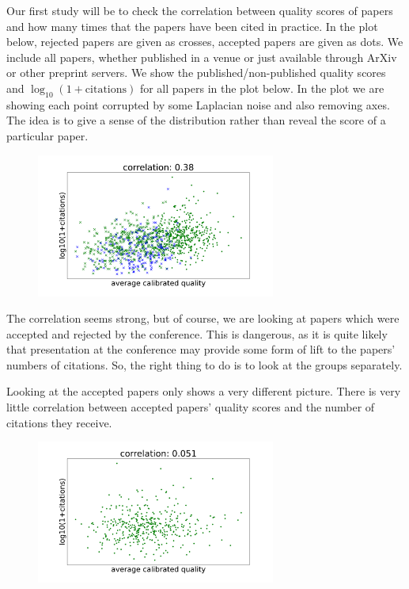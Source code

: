 Our first study will be to check the correlation between quality scores
of papers and how many times that the papers have been cited in
practice. In the plot below, rejected papers are given as crosses,
accepted papers are given as dots. We include all papers, whether
published in a venue or just available through ArXiv or other preprint
servers. We show the published/non-published quality scores and
\(\log_{10}(1+\text{citations})\) for all papers in the plot below. In
the plot we are showing each point corrupted by some Laplacian noise and
also removing axes. The idea is to give a sense of the distribution
rather than reveal the score of a particular paper.

\begin{figure}[htb]
\includegraphics[width=0.70\textwidth]{diagrams/neurips/citations-vs-average-calibrated-quality-all.pdf}


\caption{}
\label{citations-vs-average-calibrated-quality-all}
\end{figure}

The correlation seems strong, but of course, we are looking at papers
which were accepted and rejected by the conference. This is dangerous,
as it is quite likely that presentation at the conference may provide
some form of lift to the papers' numbers of citations. So, the right
thing to do is to look at the groups separately.

Looking at the accepted papers only shows a very different picture.
There is very little correlation between accepted papers' quality scores
and the number of citations they receive.

\begin{figure}[htb]
\includegraphics[width=0.70\textwidth]{diagrams/neurips/citations-vs-average-calibrated-quality-accept.pdf}


\caption{}
\label{citations-vs-average-calibrated-quality-accept}
\end{figure}

